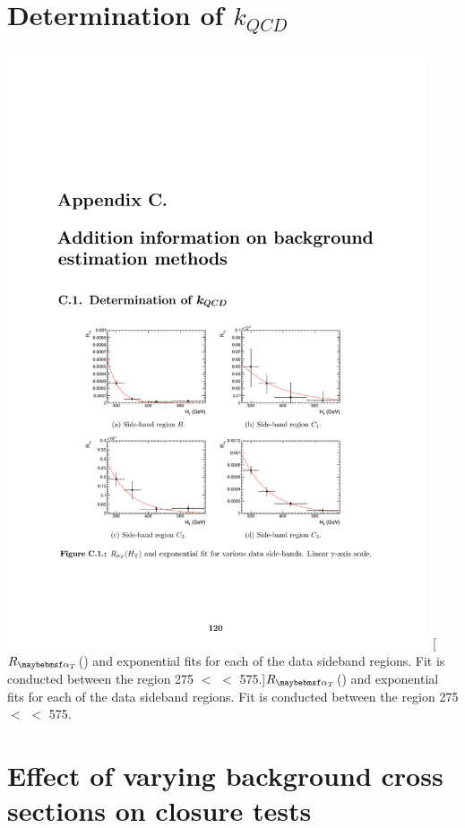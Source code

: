 \section{Determination of $k_{QCD}$}
\label{app:kqcd}


\begin{minipage}{\linewidth}
\centering
\includegraphics[width = 4.9in]{plots/qcd_sideband_fits.pdf}
[$R_{\alphat}$(\theht) and exponential fits for each of the data sideband regions. Fit is conducted between the \theht region 275 $<$ \theht $<$ 575.]{$R_{\alphat}$(\theht) and exponential fits for each of the data sideband regions. Fit is conducted between the \theht region 275 $<$ \theht $<$ 575.}
\label{fig:qcd_sideband_fits}
\end{minipage}


\section{Effect of varying background cross sections on closure tests }
\label{app:xsecvariation}

